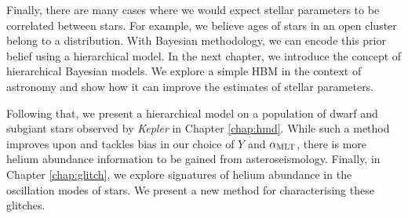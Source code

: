 Finally, there are many cases where we would expect stellar parameters to be correlated between stars. For example, we believe ages of stars in an open cluster belong to a distribution. With Bayesian methodology, we can encode this prior belief using a hierarchical model. In the next chapter, we introduce the concept of hierarchical Bayesian models. We explore a simple HBM in the context of astronomy and show how it can improve the estimates of stellar parameters.

Following that, we present a hierarchical model on a population of dwarf and subgiant stars observed by \emph{Kepler} in Chapter \ref{chap:hmd}. While such a method improves upon and tackles bias in our choice of \(Y\) and \({\alpha_\mathrm{MLT}}\), there is more helium abundance information to be gained from asteroseismology. Finally, in Chapter \ref{chap:glitch}, we explore signatures of helium abundance in the oscillation modes of stars. We present a new method for characterising these glitches.
